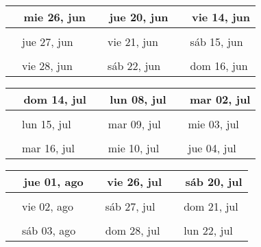\documentclass[letterpaper,10pt]{article}
\begin{document}
\begin{tabular}{lll}
\\
{\ \ mie 26, jun\hspace{4.5cm}\vspace{2.25cm}} &{\ \ jue 20, jun\hspace{4.5cm}} &{\ \ vie 14, jun\hspace{4.5cm}}
\\ \hline \\
{\ \ jue 27, jun\vspace{2.25cm}} & {\ \ vie 21, jun} & {\ \ sáb 15, jun}
\\ \hline \\
{\ \ vie 28, jun\vspace{2.25cm}} & {\ \ sáb 22, jun} & {\ \ dom 16, jun}
\\
\end{tabular}\par
\begin{tabular}{lll}
\\
{\ \ dom 14, jul\hspace{4.5cm}\vspace{2.25cm}} &{\ \ lun 08, jul\hspace{4.5cm}} &{\ \ mar 02, jul\hspace{4.5cm}}
\\ \hline \\
{\ \ lun 15, jul\vspace{2.25cm}} & {\ \ mar 09, jul} & {\ \ mie 03, jul}
\\ \hline \\
{\ \ mar 16, jul\vspace{2.25cm}} & {\ \ mie 10, jul} & {\ \ jue 04, jul}
\\
\end{tabular}\par
\begin{tabular}{lll}
\\
{\ \ jue 01, ago\hspace{4.5cm}\vspace{2.25cm}} &{\ \ vie 26, jul\hspace{4.5cm}} &{\ \ sáb 20, jul\hspace{4.5cm}}
\\ \hline \\
{\ \ vie 02, ago\vspace{2.25cm}} & {\ \ sáb 27, jul} & {\ \ dom 21, jul}
\\ \hline \\
{\ \ sáb 03, ago\vspace{2.25cm}} & {\ \ dom 28, jul} & {\ \ lun 22, jul}
\\
\end{tabular}\par
\end{document}
